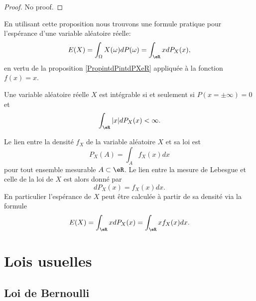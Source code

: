 \begin{proof}
    No proof.
\end{proof}

En utilisant cette proposition nous trouvons une formule pratique pour l'espérance d'une variable aléatoire réelle:
\begin{equation}
    E(X)=\int_{\Omega}X(\omega)dP(\omega)=\int_{\eR}xdP_X(x),
\end{equation}
en vertu de la proposition \ref{PropintdPintdPXeR} appliquée à la fonction \( f(x)=x\).

\begin{proposition}
    Une variable aléatoire réelle \( X\) est intégrable si et seulement si \( P(x=\pm\infty)=0\) et
    \begin{equation}
        \int_{\eR}| x |dP_X(x)<\infty.
    \end{equation}
\end{proposition}

Le lien entre la densité \( f_X\) de la variable aléatoire \( X\) et sa loi est
\begin{equation}
    P_X(A)=\int_Af_X(x)dx
\end{equation}
pour tout ensemble mesurable \( A\subset\eR\). Le lien entre la mesure de Lebesgue et celle de la loi de \( X\) est alors donné par
\begin{equation}
    dP_X(x)=f_X(x)dx.
\end{equation}
En particulier l'espérance de \( X\) peut être calculée à partir de sa densité via la formule
\begin{equation}        \label{EqEspDensform}
    E(X)=\int_{\eR}xdP_X(x)=\int_{\eR}x f_X(x)dx.
\end{equation}

\section{Lois usuelles}

\subsection{Loi de Bernoulli}

